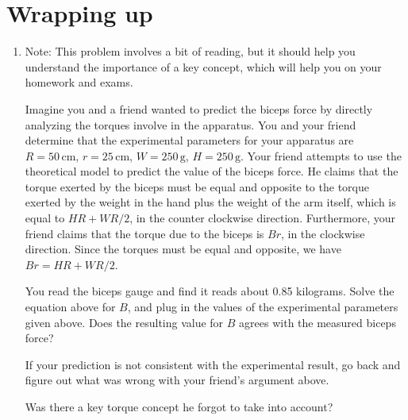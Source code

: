 \documentclass[11pt,letterpaper]{article}
\newcommand{\TODO}[2][inline,color=green!40,caption={}]{{ \todo[#1]{#2} }}
\newcommand{\TODOmeeting}[2][inline,caption={}]
		{ \todo[color=blue!40,#1]{\meeting{} #2} }
\newcommand{\question}[2][blue]{\textcolor{#1}{#2}}
\newcommand{\answer}[2][red]{\textcolor{#1}{#2}}
\renewcommand{\smans}[2]{#1\,\mathrm{#2}}
\newcommand{\meeting}[1][]{{\bf Comment from meeting:}\xspace}
\renewcommand{\question}[2][]{#2}
\renewcommand{\answer}[2][]{}
\renewcommand{\TODO}[2][]{}
\begin{document}
\section*{Wrapping up}
\begin{enumerate}[labproc]
	\item 
		Note:  This problem involves a bit of reading,
		but it should help you understand the importance of a key
		concept, which will help you on your homework and exams.

		Imagine you and a friend wanted to predict the biceps force by 
		directly analyzing the torques involve in the apparatus.
		You and your friend determine that the experimental parameters for
		your apparatus are 
		$R=\smans{50}{cm}$, $r=\smans{25}{cm}$,
		$W=\smans{250}{g}$, $H=\smans{250}{g}$.
		Your friend attempts to use the theoretical model
		to predict the value of the biceps force.
		He claims that the torque exerted by the biceps must be equal and 
		opposite to the torque exerted by the weight in the hand
		plus the weight of the arm itself, 
		which is equal to $H R + W R/2$, in the counter clockwise direction.
		Furthermore, your friend claims that the torque due to
		the biceps is $B r$, in the clockwise direction.
		Since the torques must be equal and opposite, we have
		$Br=HR+WR/2$.

		You read the biceps gauge and find it reads about 0.85 kilograms.
		Solve the equation above for $B$, and 
		\question{plug in the values of the experimental parameters
			given above.
		Does the resulting value for $B$ agrees 
		with the measured biceps force?}

		If your prediction is not consistent with the experimental result, 
		go back and figure out what was wrong with your friend's argument
		above.  

		Was there a key torque concept he forgot to take into account?
		\answer{Your friend forgot to consider the angle at which torque is
			applied.  Note:  I predict some students will try to replace $r$
		with $r/2$, since that's what it might look like is done for $W$.
		{\bf The key torque concept} your friend forgot was to consider 
		{\bf the angle at which the force is applied}.  
		}


\begin{comment}
\TODOmeeting{New problem:  Difference between this model and the real world?}
\TODO{
	New problem:  
	Ask students to estimate the `experimental parameters' associated
	with their own arms.  Maybe ask how the force compares for someone with a
	shorter arm.
	\answer{$R,r,W$ all smaller, $H,\theta$ remain the same.
		Less torque due to bicep, but also less torque due to hand force
		and weight of arm.  
		If $r$ and $R$ decrease in proportion, it takes the smaller person
		slightly less biceps force to lift the same amount of weight.
	}
}
\end{comment}
\end{enumerate}
\end{document}
